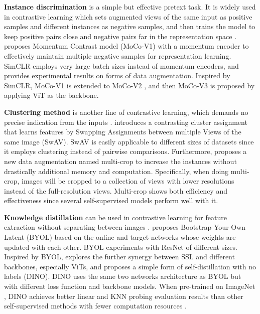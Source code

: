 \documentclass[10pt,twocolumn,letterpaper]{article}
\begin{document}
\textbf{Instance discrimination} \cite{dosovitskiy2014discriminative} is a simple but effective pretext task.
It is widely used in contrastive learning which sets augmented views of the same input as positive samples and different instances as negative samples, and then trains the model to keep positive pairs close and negative pairs far in the representation space \cite{dosovitskiy2014discriminative,wu2018unsupervised, tian2020makes,seneviratne2021self}.
\cite{he2020momentum} proposes Momentum Contrast model (MoCo-V1) with a momentum encoder to effectively maintain multiple negative samples for representation learning.
SimCLR \cite{chen2020simple} employs very large batch sizes instead of momentum encoders, and provides experimental results on  forms of data augmentation.
Inspired by SimCLR, MoCo-V1 is extended to MoCo-V2 \cite{chen2020improved}, and then MoCo-V3 \cite{chen2021empirical} is proposed by applying ViT as the backbone.

\textbf{Clustering method} is another line of contrastive learning, which demands no precise indication from the inputs \cite{caron2018deep}. 
\cite{caron2020unsupervised} introduces a contrasting cluster assignment that learns features by Swapping Assignments between multiple Views of the same image (SwAV).
SwAV is easily applicable to different sizes of datasets since it employs clustering instead of pairwise comparisons.
Furthermore, \cite{caron2020unsupervised} proposes a new data augmentation named multi-crop to increase the instances without drastically additional memory and computation.  
Specifically, when doing multi-crop, images will be cropped to a collection of views with lower resolutions instead of the full-resolution views.
Multi-crop shows both efficiency and effectiveness since several self-supervised models \cite{caron2018deep,asano2019self,chen2020simple} perform well with it.



\textbf{Knowledge distillation} can be used in contrastive learning for feature extraction without separating between images \cite{caron2021emerging}.
\cite{grill2020bootstrap} proposes Bootstrap Your Own Latent (BYOL) based on the online and target networks whose weights are updated with each other.
BYOL experiments with ResNet of different sizes.
Inspired by BYOL, \cite{caron2021emerging} explores the further synergy between SSL and different backbones, especially ViTs, and proposes a simple form of self-distillation with no labels (DINO).
DINO uses the same two networks architecture as BYOL but with different loss function and backbone models.
When pre-trained on ImageNet \cite{russakovsky2015imagenet}, DINO achieves better linear and KNN probing evaluation results than other self-supervised methods with fewer computation resources \cite{grill2020bootstrap,caron2020unsupervised,caron2021emerging}.
\end{document}
